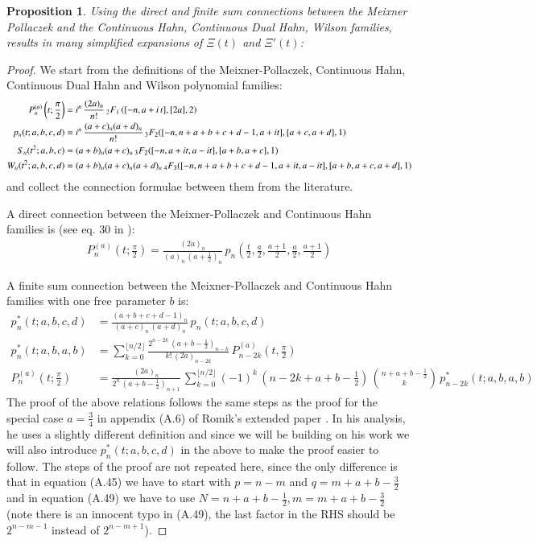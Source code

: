 \documentclass[a4paper,11pt,twoside]{amsart}
\newtheorem{proposition}[theorem]{Proposition}
\newcommand{\verifiedeq}{=}
\newcommand{\defeq}{=}
\newcommand{\verifiedeq}{\stackrel{\checkmark}{=}}
\newcommand{\defeq}{\stackrel{\scriptscriptstyle \textnormal{def}}{=}}
\begin{document}
\begin{proposition}
Using the direct and finite sum connections between the Meixner Pollaczek and the Continuous Hahn, Continuous Dual Hahn, Wilson families, results in many simplified  expansions of $\Xi(t)$ and $\Xi'(t)$: 
\end{proposition}
\begin{proof}  
We start from the definitions of the Meixner-Pollaczek, Continuous Hahn, Continuous Dual Hahn and Wilson polynomial families:
\begin{align}
  P_n^{(a)}\left(t;\frac{\pi}{2}\right) &\defeq i^n\,\frac{(2a)_n}{n!}\,{}_2F_1\left([-n, a+i\,t],[2a],2\right) \notag \\ 
  p_n(t;a,b,c,d) &\defeq i^n\,\frac{(a+c)_n(a+d)_n}{n!}\, {}_3F_2([-n, n+ a+b+c+d-1,a+it], [a+c, a+d], 1) \notag \\
  S_n(t^2;a,b,c) &\defeq (a+b)_n(a+c)_n\, {}_3F_2([-n,a+it, a- it], [a+b, a+c], 1) \notag\\
  W_n(t^2;a,b,c,d) &\defeq (a+b)_n(a+c)_n(a+d)_n\,{}_4F_3([-n, n+ a+b+c+d-1,a+it, a- it], [a+b, a+c, a+d], 1) \notag
\end{align}
and collect the connection formulae between them from the literature.


A direct connection between the Meixner-Pollaczek and Continuous Hahn families is (see eq. 30 in \cite{koesup}):
\begin{align}
 P_n^{(a)}\left(t;\frac{\pi}{2}\right) \defeq \frac{(2a)_n}{(a)_n\,\left(a+\frac12\right)_n}\,p_n\left(\frac{t}{2},\frac{a}{2},\frac{a+1}{2},\frac{a}{2},\frac{a+1}{2}\right) \label{con1}
\end{align}

A finite sum connection between the Meixner-Pollaczek and Continuous Hahn families with one free parameter $b$ is: 
\begin{align}
 p^*_n(t;a,b,c,d) &\defeq \frac{(a+b+c+d-1)_n}{(a+c)_n\,(a+d)_n}\,p_n(t;a,b,c,d) \\
p^*_n(t;a,b,a,b) &\defeq \sum_{k=0}^{\lfloor n/2\rfloor} \frac{2^{n-2k}\,\left(a+b-\frac12\right)_{n-k}}{k!\,(2a)_{n-2k}}\,P_{n-2k}^{(a)}\left(t,\frac{\pi}{2}\right) \\ 
P_n^{(a)}\left(t;\frac{\pi}{2}\right) &\defeq \frac{(2a)_n}{2^n\,\left(a+b-\frac12\right)_{n+1}}\,\sum_{k=0}^{\lfloor n/2\rfloor} (-1)^k\,\left(n-2k+a+b-\frac12\right)\,\binom{n+a+b-\frac12}{k}\,p^*_{n-2k}(t;a,b,a,b) \label{con2}
\end{align}
The proof of the above relations follows the same steps as the proof for the special case $a=\frac34$ in appendix (A.6) of Romik's extended paper \cite{rom}. In his analysis, he uses a slightly different definition and since we will be building on his work we will also introduce $p^*_n(t;a,b,c,d)$ in the above to make the proof easier to follow. The steps of the proof are not repeated here, since the only difference is that in equation (A.45) we have to start with $p\verifiedeq n-m$ and $q\verifiedeq m+a+b-\frac32$ and in equation (A.49) we have to use $N \verifiedeq n + a+b - \frac12, m \verifiedeq m +a+b-\frac32$ (note there is an innocent typo in (A.49), the last factor in the RHS should be $2^{n-m-1}$ instead of $2^{n-m+1}$).


\end{proof}
\end{document}
